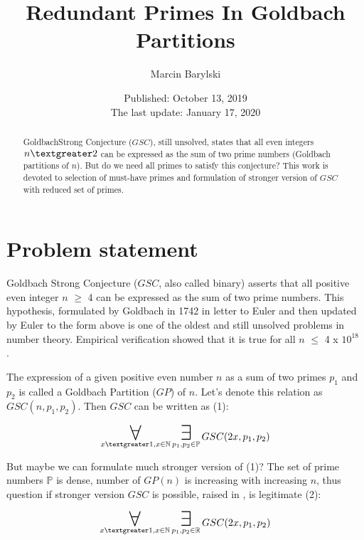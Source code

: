 \documentclass[10pt,twocolumn]{article}
\title{Redundant Primes In Goldbach Partitions}
\author{Marcin Barylski}
\date{\small{Published: October 13, 2019 \\ The last update: January 17, 2020}}
\newcommand\bigforall{\mbox{\huge $\mathsurround0pt\forall$}}
\newcommand\bigexists{\mbox{\huge $\mathsurround0pt\exists$}}
\begin{document}
\maketitle

\begin{abstract}
GoldbachStrong Conjecture ($GSC$), still unsolved, states that all even integers $n \textgreater 2$ can be expressed as the sum of two prime numbers (Goldbach partitions of $n$). But do we need all primes to satisfy this conjecture? This work is devoted to selection of must-have primes and formulation of stronger version of $GSC$ with reduced set of primes.
\end{abstract}

\section{Problem statement}

Goldbach Strong Conjecture ($GSC$, also called binary) asserts that all positive even integer $n$ $\geq$ 4 can be expressed as the sum of two prime numbers. This hypothesis, formulated by Goldbach in 1742 in letter to Euler \cite{goldbach1742} and then updated by Euler to the form above is one of the oldest and still unsolved problems in number theory. Empirical verification showed that it is true for all $n$ $\leq$ 4 x $10^{18}$ \cite{oliveira2012} \cite{oliveira2013}.\par
The expression of a given positive even number $n$ as a sum of two primes $p_1$ and $p_2$ is called a Goldbach Partition ($GP$) of $n$.  Let's denote this relation as $GSC(n, p_1, p_2)$. Then $GSC$ can be written as (1):

\begin{equation}
\displaystyle\mathop{\bigforall}_{x \textgreater 1, x \in \mathbb{N}} \displaystyle\mathop{\bigexists}_{p_1, p_2 \in \mathbb{P}} GSC (2x, p_1, p_2)
\end{equation}

But maybe we can formulate much stronger version of (1)? The set of prime numbers $\mathbb{P}$ is dense, number of $GP(n)$ is increasing with increasing $n$, thus question if stronger version $GSC$ is possible, raised in \cite{barylski2018}, is legitimate (2):

\begin{equation}
\displaystyle\mathop{\bigforall}_{x \textgreater 1, x \in \mathbb{N}} \displaystyle\mathop{\bigexists}_{p_1, p_2 \in \mathbb{R}} GSC (2x, p_1, p_2)
\end{equation}
\end{document}
